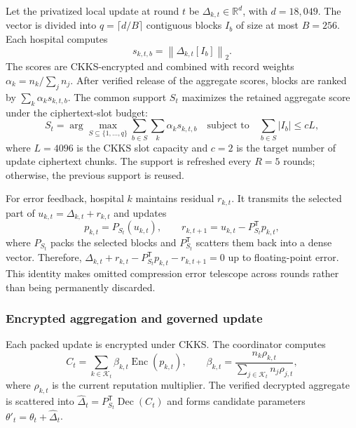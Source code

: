 Let the privatized local update at round $t$ be $\Delta_{k,t}\in\mathbb{R}^{d}$, with $d=18{,}049$. The vector is divided into $q=\lceil d/B\rceil$ contiguous blocks $I_b$ of size at most $B=256$. Each hospital computes
\begin{equation}
    s_{k,t,b}=\left\lVert\Delta_{k,t}[I_b]\right\rVert_2.
    \label{eq:block-score}
\end{equation}
The scores are CKKS-encrypted and combined with record weights $\alpha_k=n_k/\sum_j n_j$. After verified release of the aggregate scores, blocks are ranked by $\sum_k\alpha_ks_{k,t,b}$. The common support $S_t$ maximizes the retained aggregate score under the ciphertext-slot budget:
\begin{equation}
    S_t=\arg\max_{S\subseteq\{1,\ldots,q\}}
    \sum_{b\in S}\sum_k\alpha_ks_{k,t,b}
    \quad\text{subject to}\quad
    \sum_{b\in S}|I_b|\leq cL,
    \label{eq:caabc-support}
\end{equation}
where $L=4096$ is the CKKS slot capacity and $c=2$ is the target number of update ciphertext chunks. The support is refreshed every $R=5$ rounds; otherwise, the previous support is reused.

For error feedback, hospital $k$ maintains residual $r_{k,t}$. It transmits the selected part of $u_{k,t}=\Delta_{k,t}+r_{k,t}$ and updates
\begin{equation}
    p_{k,t}=P_{S_t}(u_{k,t}),
    \qquad
    r_{k,t+1}=u_{k,t}-P_{S_t}^{\mathsf T}p_{k,t},
    \label{eq:error-feedback}
\end{equation}
where $P_{S_t}$ packs the selected blocks and $P_{S_t}^{\mathsf T}$ scatters them back into a dense vector. Therefore,
$\Delta_{k,t}+r_{k,t}-P_{S_t}^{\mathsf T}p_{k,t}-r_{k,t+1}=0$ up to floating-point error. This identity makes omitted compression error telescope across rounds rather than being permanently discarded.

\subsubsection{Encrypted aggregation and governed update}

Each packed update is encrypted under CKKS. The coordinator computes
\begin{equation}
    C_t = \sum_{k\in\mathcal{K}_t}\beta_{k,t}\operatorname{Enc}(p_{k,t}),
    \qquad
    \beta_{k,t}=
    \frac{n_k\rho_{k,t}}{\sum_{j\in\mathcal{K}_t}n_j\rho_{j,t}},
    \label{eq:encrypted-aggregate}
\end{equation}
where $\rho_{k,t}$ is the current reputation multiplier. The verified decrypted aggregate is scattered into $\widehat\Delta_t=P_{S_t}^{\mathsf T}\operatorname{Dec}(C_t)$ and forms candidate parameters $\theta'_t=\theta_t+\widehat\Delta_t$.

